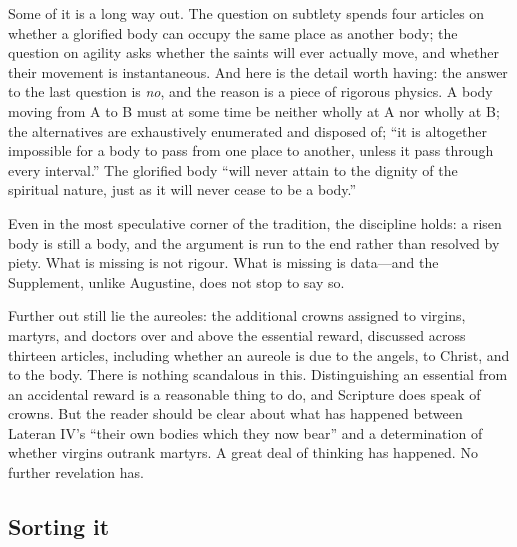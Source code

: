 Some of it is a long way out. The question on subtlety spends four articles on whether a glorified body can occupy the same place as another body; the question on agility asks whether the saints will ever actually move, and whether their movement is instantaneous. And here is the detail worth having: the answer to the last question is \emph{no}, and the reason is a piece of rigorous physics. A body moving from A to B must at some time be neither wholly at A nor wholly at B; the alternatives are exhaustively enumerated and disposed of; ``it is altogether impossible for a body to pass from one place to another, unless it pass through every interval.'' The glorified body ``will never attain to the dignity of the spiritual nature, just as it will never cease to be a body.''

Even in the most speculative corner of the tradition, the discipline holds: a risen body is still a body, and the argument is run to the end rather than resolved by piety. What is missing is not rigour. What is missing is data---and the Supplement, unlike Augustine, does not stop to say so.

Further out still lie the aureoles: the additional crowns assigned to virgins, martyrs, and doctors over and above the essential reward, discussed across thirteen articles, including whether an aureole is due to the angels, to Christ, and to the body. There is nothing scandalous in this. Distinguishing an essential from an accidental reward is a reasonable thing to do, and Scripture does speak of crowns. But the reader should be clear about what has happened between Lateran IV's ``their own bodies which they now bear'' and a determination of whether virgins outrank martyrs. A great deal of thinking has happened. No further revelation has.

\subsection{Sorting it}

